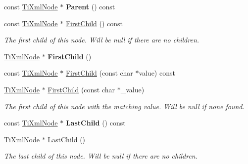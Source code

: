 \begin{DoxyCompactItemize}
const \hyperlink{class_ti_xml_node}{Ti\+Xml\+Node} $\ast$ {\bfseries Parent} () const
\item 
\hypertarget{class_ti_xml_node_aa66bceae19707c90c1db12d7c98894a4}{}\label{class_ti_xml_node_aa66bceae19707c90c1db12d7c98894a4} 
const \hyperlink{class_ti_xml_node}{Ti\+Xml\+Node} $\ast$ \hyperlink{class_ti_xml_node_aa66bceae19707c90c1db12d7c98894a4}{First\+Child} () const
\begin{DoxyCompactList}\small\item\em The first child of this node. Will be null if there are no children. \end{DoxyCompactList}\item 
\hypertarget{class_ti_xml_node_a5e97d69b7c0ebd27fb7286be56559b77}{}\label{class_ti_xml_node_a5e97d69b7c0ebd27fb7286be56559b77} 
\hyperlink{class_ti_xml_node}{Ti\+Xml\+Node} $\ast$ {\bfseries First\+Child} ()
\item 
const \hyperlink{class_ti_xml_node}{Ti\+Xml\+Node} $\ast$ \hyperlink{class_ti_xml_node_ae98c367f664890c4b5a5183481ec128a}{First\+Child} (const char $\ast$value) const
\item 
\hypertarget{class_ti_xml_node_abc8bf32be6419ec453a731868de19554}{}\label{class_ti_xml_node_abc8bf32be6419ec453a731868de19554} 
\hyperlink{class_ti_xml_node}{Ti\+Xml\+Node} $\ast$ \hyperlink{class_ti_xml_node_abc8bf32be6419ec453a731868de19554}{First\+Child} (const char $\ast$\+\_\+value)
\begin{DoxyCompactList}\small\item\em The first child of this node with the matching \textquotesingle{}value\textquotesingle{}. Will be null if none found. \end{DoxyCompactList}\item 
\hypertarget{class_ti_xml_node_af3a04120b1ed2fead2f4bb72cbea845e}{}\label{class_ti_xml_node_af3a04120b1ed2fead2f4bb72cbea845e} 
const \hyperlink{class_ti_xml_node}{Ti\+Xml\+Node} $\ast$ {\bfseries Last\+Child} () const
\item 
\hypertarget{class_ti_xml_node_a6432d2b2495f6caf9cb4278df706a031}{}\label{class_ti_xml_node_a6432d2b2495f6caf9cb4278df706a031} 
\hyperlink{class_ti_xml_node}{Ti\+Xml\+Node} $\ast$ \hyperlink{class_ti_xml_node_a6432d2b2495f6caf9cb4278df706a031}{Last\+Child} ()
\begin{DoxyCompactList}\small\item\em The last child of this node. Will be null if there are no children. \end{DoxyCompactList}\item 

\end{DoxyCompactItemize}
